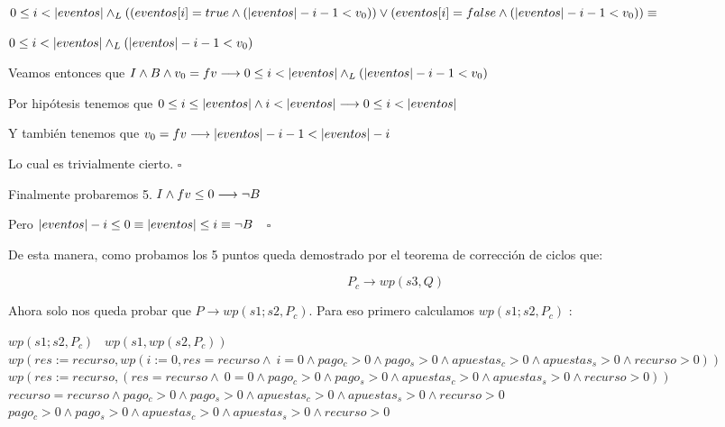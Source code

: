 \documentclass[10pt,a4paper]{article}
\begin{document}
$ 0 \leq i < |eventos| \land _L ((eventos[i] = true \land (|eventos| - i - 1 < v_0)) \lor (eventos[i] = false \land (|eventos| - i - 1 < v_0)) \equiv$
\vspace{16pt}

$ 0 \leq i < |eventos| \land _L (|eventos| - i - 1 < v_0)$
\vspace{16pt}

Veamos entonces que $I \land B \land v_0 = fv \longrightarrow 0 \leq i < |eventos| \land _L (|eventos| - i - 1 < v_0)$
\vspace{8pt}

Por hipótesis tenemos que $0 \leq i \leq |eventos| \land i < |eventos| \longrightarrow 0 \leq i < |eventos|$
\vspace{8pt}

Y también tenemos que $v_0 = fv \longrightarrow |eventos| - i - 1 < |eventos| - i$
\vspace{8pt}

Lo cual es trivialmente cierto. $\square$
\vspace{16pt}

Finalmente probaremos 5. $I \land fv \leq 0 \longrightarrow \lnot B$
\vspace{8pt}

Pero $|eventos| - i \leq 0 \equiv |eventos| \leq i \equiv \neg B$ \,\, $\square$

\vspace{\baselineskip}

De esta manera, como probamos los 5 puntos queda demostrado por el teorema de corrección de ciclos que: 

\begin{equation}
    P_c \xrightarrow{} wp(s3,Q) 
\end{equation}

\vspace{\baselineskip}
Ahora solo nos queda probar que ${P \xrightarrow{} wp(s1;s2,P_c)}$. Para eso primero calculamos $wp(s1;s2,P_c)$ : 

\vspace{8pt}

$wp(s1;s2,P_c)$ \equiv \ $wp(s1,wp(s2,P_c))$ \ \equiv \ $wp(res := recurso,wp(i := 0, res = recurso \land \ i = 0 \land pago_c > 0 \land pago_s > 0 \land apuestas_c > 0 \land apuestas_s > 0 \land recurso > 0))$ \equiv \ $wp(res := recurso,(res = recurso \land \ 0 = 0 \land pago_c > 0 \land pago_s > 0 \land apuestas_c > 0 \land apuestas_s > 0 \land recurso > 0))$ \equiv \ $recurso = recurso \land  pago_c > 0 \land pago_s > 0 \land apuestas_c > 0 \land apuestas_s > 0 \land recurso > 0$ \equiv \ $pago_c > 0 \land pago_s > 0 \land apuestas_c > 0 \land apuestas_s > 0 \land recurso > 0$
\end{document}

